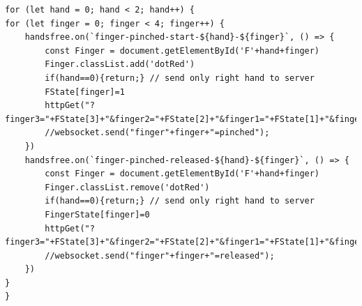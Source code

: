 \documentclass[a4paper,12pt,final]{article} %
\numberwithin{equation}{section} %
\numberwithin{figure}{section} %
\numberwithin{table}{section} %
\begin{document}
\begin{lstlisting}[firstnumber=104]
for (let hand = 0; hand < 2; hand++) {
for (let finger = 0; finger < 4; finger++) {
	handsfree.on(`finger-pinched-start-${hand}-${finger}`, () => {
		const Finger = document.getElementById('F'+hand+finger)
		Finger.classList.add('dotRed')
		if(hand==0){return;} // send only right hand to server
		FState[finger]=1
		httpGet("?finger3="+FState[3]+"&finger2="+FState[2]+"&finger1="+FState[1]+"&finger0="+FState[0])
		//websocket.send("finger"+finger+"=pinched");
	})
	handsfree.on(`finger-pinched-released-${hand}-${finger}`, () => {
		const Finger = document.getElementById('F'+hand+finger)
		Finger.classList.remove('dotRed')
		if(hand==0){return;} // send only right hand to server
		FingerState[finger]=0
		httpGet("?finger3="+FState[3]+"&finger2="+FState[2]+"&finger1="+FState[1]+"&finger0="+FState[0])
		//websocket.send("finger"+finger+"=released");
	})
}
}
\end{lstlisting}
\end{document}
